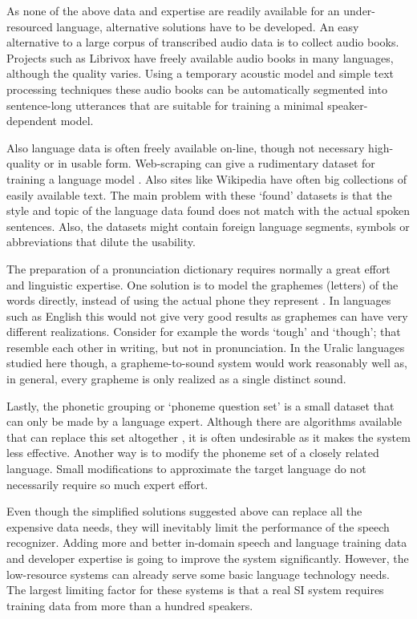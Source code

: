 \documentclass[b5paper]{article}
\begin{document}
As none of the above data and expertise are readily available for an under-resourced language, alternative solutions have to be developed. An easy alternative to a large corpus of transcribed audio data is to collect audio books. Projects such as Librivox have freely available audio books in many languages, although the quality varies. Using a temporary acoustic model and simple text processing techniques these audio books can be automatically segmented into sentence-long utterances that are suitable for training a minimal speaker-dependent model.

Also language data is often freely available on-line, though not necessary high-quality or in usable form. Web-scraping can give a rudimentary dataset for training a language model \cite{scannell2007crubadan}.  Also sites like Wikipedia have often big collections of easily available text. The main problem with these `found' datasets is that the style and topic of the language data found does not match with the actual spoken sentences. Also, the datasets might contain foreign language segments, symbols or abbreviations that dilute the usability.

The preparation of a pronunciation dictionary requires normally a great effort and linguistic expertise. One solution is to model the graphemes (letters) of the words directly, instead of using the actual phone they represent \cite{kanthak2003multilingual}. In languages such as English this would not give very good results as graphemes can have very different realizations. Consider for example the words `tough' and `though'; that resemble each other in writing, but not in pronunciation. In the Uralic languages studied here though, a grapheme-to-sound system would work reasonably well as, in general, every grapheme is only realized as a single distinct sound.

Lastly, the phonetic grouping or `phoneme question set' is a small dataset that can only be made by a language expert. Although there are algorithms available that can replace this set altogether \cite{darjaa2011effective}, it is often undesirable as it makes the system less effective. Another way is to modify the phoneme set of a closely related language. Small modifications to approximate the target language do not necessarily require so much expert effort.

Even though the simplified solutions suggested above can replace all the expensive data needs, they will inevitably limit the performance of the speech recognizer. Adding more and better in-domain speech and language training data and developer expertise is going to improve the system significantly. However, the low-resource systems can already serve some basic language technology needs. The largest limiting factor for these systems is that a real SI system requires training data from more than a hundred speakers.
\end{document}
